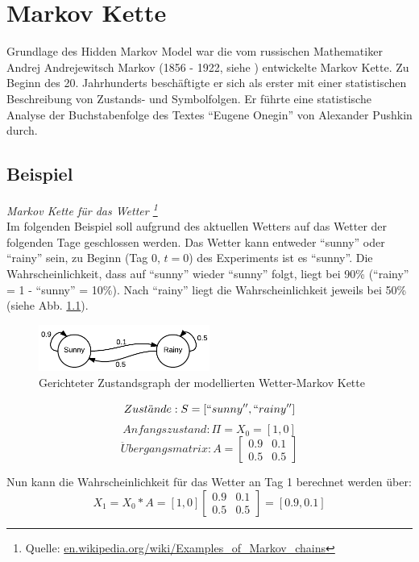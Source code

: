 \chapter{Markov Kette} 
\label{mainsec:mk}
Grundlage des Hidden Markov Model war die vom russischen Mathematiker Andrej Andrejewitsch Markov 
(1856 - 1922, siehe \cite{markov1913}) entwickelte Markov Kette. Zu Beginn des 20. Jahrhunderts beschäftigte er sich als erster mit einer statistischen Beschreibung von Zustands- und Symbolfolgen. Er führte eine statistische Analyse der Buchstabenfolge des Textes ``Eugene Onegin'' von Alexander Pushkin durch.


\section{Beispiel} 
\textit{ Markov Kette für das Wetter \footnote{Quelle: \url{en.wikipedia.org/wiki/Examples_of_Markov_chains}}} \\
Im folgenden Beispiel soll aufgrund des aktuellen Wetters auf das Wetter der folgenden Tage geschlossen werden.
Das Wetter kann entweder ``sunny'' oder ``rainy'' sein, zu Beginn (Tag 0, \( t = 0 \)) des Experiments ist es ``sunny''.
Die Wahrscheinlichkeit, dass auf ``sunny'' wieder ``sunny'' folgt, liegt bei 90\% (``rainy'' = 1 - ``sunny'' = 10\%). 
Nach ``rainy'' liegt die Wahrscheinlichkeit jeweils bei 50\% (siehe Abb. \ref{fig:simple_mc_example}).  
\begin{figure}[htbp] \centering
    \includegraphics[width=0.5\textwidth]{Bilder/Kap2/simple_mc_example.png}
    \caption{ Gerichteter Zustandsgraph der modellierten Wetter-Markov Kette }
    \label{fig:simple_mc_example}
\end{figure}


\[ Zust\ddot{a}nde: S = [``sunny'', ``rainy''] \]
\[ Anfangszustand:  \Pi = X_0 = [1 , 0] \]
\[\ddot{U}bergangsmatrix: A = \begin {bmatrix} 0.9&0.1\\0.5&0.5 \end {bmatrix}
\]

Nun kann die Wahrscheinlichkeit für das Wetter an Tag 1 berechnet werden über: \\
\[ X_1 = X_0 * A = [ 1, 0 ] \begin {bmatrix} 0.9&0.1\\0.5&0.5 \end {bmatrix} = [ 0.9, 0.1] \]

